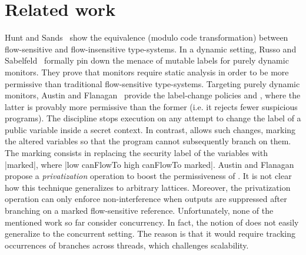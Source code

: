 \section{Related work}
\label{sec:related}

Hunt and Sands~\citep{Hunt:2006} show the equivalence (modulo code
transformation) between flow-sensitive and flow-insensitive type-systems. 
In a dynamic setting, Russo and Sabelfeld~\citep{Russo:2010} formally pin down
the menace of mutable labels for purely dynamic monitors. They prove that
monitors require static analysis in order to be more permissive than traditional
flow-sensitive type-systems. Targeting purely dynamic monitors, Austin and
Flanagan~\citep{Austin:Flanagan:PLAS09,Austin:Flanagan:PLAS10} provide the
label-change policies \emph{\nsu} and \emph{\pu}, where the latter is provably
more permissive than the former (i.e. it rejects fewer suspicious programs). The
{\nsu} discipline stops  execution on any attempt to change the label of a
public variable inside a secret context. In contrast, {\pu} allows such changes,
marking the altered variables so that the program cannot subsequently branch on
them. The marking consists in replacing the security label of the variables with
|marked|, where |low canFlowTo high canFlowTo marked|.  Austin and Flanagan
propose a \emph{privatization} operation to boost the permissiveness of {\pu}.
It is not clear how this technique generalizes to arbitrary lattices. Moreover,
the privatization operation can only enforce non-interference when outputs are
suppressed after branching on a marked flow-sensitive reference. Unfortunately,
none of the mentioned work so far consider concurrency. In fact, the notion of
{\pu} does not easily generalize to the concurrent setting. The reason is that
it would require tracking occurrences of branches across threads, which
challenges scalability.

